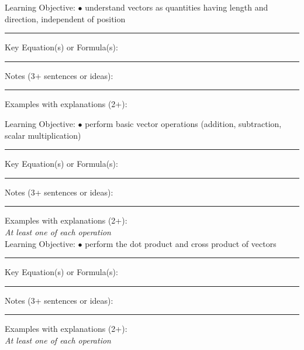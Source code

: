 \documentclass{article}
\theoremstyle{plain}
\theoremstyle{definition}
\theoremstyle{remark}
\begin{document}
\vskip-2pt
\noindent \large Learning Objective:
\normalsize
\vskip0.15in
\indent $\bullet$ understand vectors as quantities having length and direction, independent of position
\vskip0.15in
\hrule
\vspace{0.1in}
\large \noindent Key Equation(s) or Formula(s):
\normalsize

\vspace{1in}
\hrule
\vspace{0.1in}
\large \noindent Notes (3+ sentences or ideas):
\normalsize
\vspace{1.75in}
\hrule
\vspace{0.1in}

\large \noindent Examples with explanations (2+):

\newpage
\noindent \large Learning Objective:
\normalsize
\vskip0.15in
\indent $\bullet$ perform basic vector operations (addition, subtraction, scalar multiplication)
\vskip0.15in
\hrule
\vspace{0.1in}
\large \noindent Key Equation(s) or Formula(s):
\normalsize

\vspace{1in}
\hrule
\vspace{0.1in}
\large \noindent Notes (3+ sentences or ideas):
\normalsize
\vspace{1.75in}
\hrule
\vspace{0.1in}

\large \noindent Examples with explanations (2+):\\
\emph{At least one of each operation}\\

\newpage
\noindent \large Learning Objective:
\normalsize
\vskip0.15in
\indent $\bullet$ perform the dot product and cross product of vectors
\vskip0.15in
\hrule
\vspace{0.1in}
\large \noindent Key Equation(s) or Formula(s):
\normalsize

\vspace{1in}
\hrule
\vspace{0.1in}
\large \noindent Notes (3+ sentences or ideas):
\normalsize
\vspace{1.75in}
\hrule
\vspace{0.1in}

\large \noindent Examples with explanations (2+):\\
\emph{At least one of each operation}\\
\end{document}
